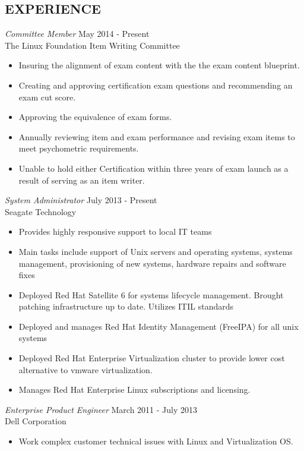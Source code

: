 \documentclass[margin]{res}
\begin{document}
\begin{resume}
\section{EXPERIENCE} 
	{\sl Committee Member} \hfill May 2014 - Present \\
    The Linux Foundation Item Writing Committee
    \begin{itemize}  \itemsep -2pt %
    \item Insuring the alignment of exam content with the the exam content blueprint.
    \item Creating and approving certification exam questions and recommending an exam cut score.
    \item Approving the equivalence of exam forms.
    \item Annually reviewing item and exam performance and revising exam items to meet psychometric requirements.
    \item Unable to hold either Certification within three years of exam launch as a result of serving as an item writer.
    \end{itemize}
	{\sl System Administrator} \hfill July 2013 - Present \\
	Seagate Technology
	\begin{itemize}  \itemsep -2pt %
		\item Provides highly responsive support to local IT teams
		\item Main tasks include support of Unix servers and operating systems, systems management, provisioning of new systems, hardware repairs and software fixes
		\item Deployed Red Hat Satellite 6 for systems lifecycle management. Brought patching infrastructure up to date. Utilizes ITIL standards
		\item Deployed and manages Red Hat Identity Management (FreeIPA) for all unix systems
		\item Deployed Red Hat Enterprise Virtualization cluster to provide lower cost alternative to vmware virtualization. 
		\item Manages Red Hat Enterprise Linux subscriptions and licensing. 
	\end{itemize}
 	{\sl Enterprise Product Engineer} \hfill March 2011 - July 2013 \\
 	Dell Corporation
 	\begin{itemize}  \itemsep -2pt %
 		\item Work complex customer technical issues with Linux and Virtualization OS.

\end{itemize}
\end{resume}
\end{document}
